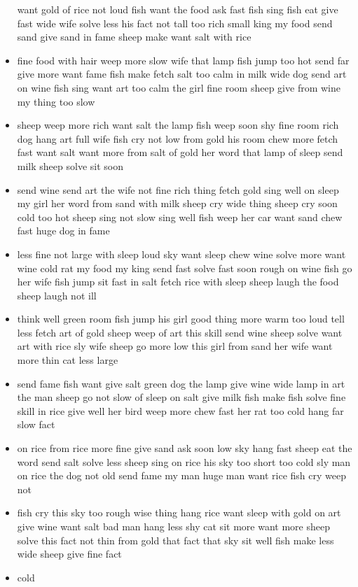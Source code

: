 \documentclass[10pt,letterpaper]{article}
\begin{document}
\begin{flushleft}
\begin{itemize}
want
gold
of
rice
not
loud
fish
want
the
food
ask
fast
fish
sing
fish
eat
give
fast
wide
wife
solve
less
his
fact
not
tall
too
rich
small
king
my
food
send
sand
give
sand
in
fame
sheep
make
want
salt
with
rice
  \item fine
food
with
hair
weep
more
slow
wife
that
lamp
fish
jump
too
hot
send
far
give
more
want
fame
fish
make
fetch
salt
too
calm
in
milk
wide
dog
send
art
on
wine
fish
sing
want
art
too
calm
the
girl
fine
room
sheep
give
from
wine
my
thing
too
slow
  \item sheep
weep
more
rich
want
salt
the
lamp
fish
weep
soon
shy
fine
room
rich
dog
hang
art
full
wife
fish
cry
not
low
from
gold
his
room
chew
more
fetch
fast
want
salt
want
more
from
salt
of
gold
her
word
that
lamp
of
sleep
send
milk
sheep
solve
sit
soon
  \item send
wine
send
art
the
wife
not
fine
rich
thing
fetch
gold
sing
well
on
sleep
my
girl
her
word
from
sand
with
milk
sheep
cry
wide
thing
sheep
cry
soon
cold
too
hot
sheep
sing
not
slow
sing
well
fish
weep
her
car
want
sand
chew
fast
huge
dog
in
fame
  \item less
fine
not
large
with
sleep
loud
sky
want
sleep
chew
wine
solve
more
want
wine
cold
rat
my
food
my
king
send
fast
solve
fast
soon
rough
on
wine
fish
go
her
wife
fish
jump
sit
fast
in
salt
fetch
rice
with
sleep
sheep
laugh
the
food
sheep
laugh
not
ill
  \item think
well
green
room
fish
jump
his
girl
good
thing
more
warm
too
loud
tell
less
fetch
art
of
gold
sheep
weep
of
art
this
skill
send
wine
sheep
solve
want
art
with
rice
sly
wife
sheep
go
more
low
this
girl
from
sand
her
wife
want
more
thin
cat
less
large
  \item send
fame
fish
want
give
salt
green
dog
the
lamp
give
wine
wide
lamp
in
art
the
man
sheep
go
not
slow
of
sleep
on
salt
give
milk
fish
make
fish
solve
fine
skill
in
rice
give
well
her
bird
weep
more
chew
fast
her
rat
too
cold
hang
far
slow
fact
  \item on
rice
from
rice
more
fine
give
sand
ask
soon
low
sky
hang
fast
sheep
eat
the
word
send
salt
solve
less
sheep
sing
on
rice
his
sky
too
short
too
cold
sly
man
on
rice
the
dog
not
old
send
fame
my
man
huge
man
want
rice
fish
cry
weep
not
  \item fish
cry
this
sky
too
rough
wise
thing
hang
rice
want
sleep
with
gold
on
art
give
wine
want
salt
bad
man
hang
less
shy
cat
sit
more
want
more
sheep
solve
this
fact
not
thin
from
gold
that
fact
that
sky
sit
well
fish
make
less
wide
sheep
give
fine
fact
  \item cold

\end{itemize}
\end{flushleft}
\end{document}

